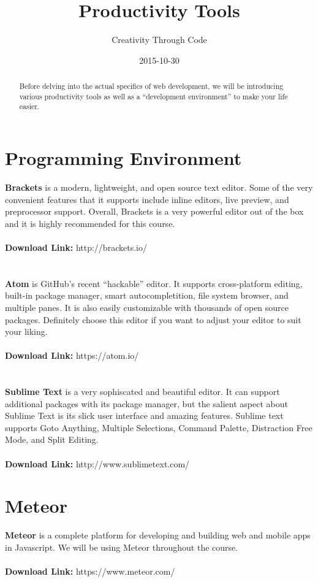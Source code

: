 \documentclass[11pt, letterpaper]{article}
\title{Productivity Tools}
\date{2015-10-30}
\author{Creativity Through Code}
\begin{document}
	\maketitle
	\newpage
	\begin{abstract}
		Before delving into the actual specifics of web development, we will be introducing various productivity tools as well as a ``development environment'' to make your life easier.
	\end{abstract}
	\section{Programming Environment}
		\textbf{Brackets} is a modern, lightweight, and open source text editor. Some of the very convenient features that it supports include inline editors, live preview, and preprocessor support. Overall, Brackets is a very powerful editor out of the box and it is highly recommended for this course.
		\\\\
		\textbf{Download Link:} http://brackets.io/
		\\\\\\
		\textbf{Atom} is GitHub's recent ``hackable'' editor. It supports cross-platform editing, built-in package manager, smart autocompletition, file system browser, and multiple panes. It is also easily customizable with thousands of open source packages. Definitely choose this editor if you want to adjust your editor to suit your liking.
		\\\\
		\textbf{Download Link:} https://atom.io/
		\\\\\\
		\textbf{Sublime Text} is a very sophiscated and beautiful editor. It can support additional packages with its package manager, but the salient aspect about Sublime Text is its slick user interface and amazing features. Sublime text supports Goto Anything, Multiple Selections, Command Palette, Distraction Free Mode, and Split Editing.
		\\\\
		\textbf{Download Link:} http://www.sublimetext.com/ 
	\section{Meteor}
		\textbf{Meteor} is a complete platform for developing and building web and mobile apps in Javascript. We will be using Meteor throughout the course.
		\\\\
		\textbf{Download Link:} https://www.meteor.com/
\end{document}
